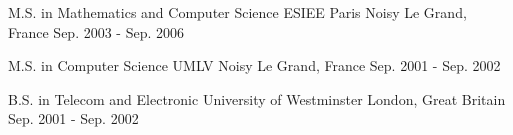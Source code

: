 

\begin{cventries}

  \cventry
    {M.S. in Mathematics and Computer Science} %
    {ESIEE Paris} %
    {Noisy Le Grand, France} %
    {Sep. 2003 - Sep. 2006} %
    {
    }

  \cventry
    {M.S. in Computer Science} %
    {UMLV} %
    {Noisy Le Grand, France} %
    {Sep. 2001 - Sep. 2002} %
    {
    }

  \cventry
    {B.S. in Telecom and Electronic} %
    {University of Westminster} %
    {London, Great Britain} %
    {Sep. 2001 - Sep. 2002} %
    {
    }

\end{cventries}
